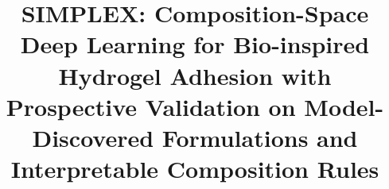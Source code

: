 \documentclass[utf8]{FrontiersinHarvard}
\begin{document}
\onecolumn
{}

\title[SIMPLEX: composition-space deep learning for hydrogel adhesion screening]{SIMPLEX: Composition-Space Deep Learning for Bio-inspired Hydrogel Adhesion with Prospective Validation on Model-Discovered Formulations and Interpretable Composition Rules}
\end{document}
